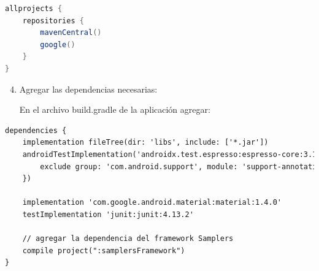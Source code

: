 \begin{lstlisting}[language=Java, frame=tlbr, caption=Configuración del repositorio de Google(línea 4)]
allprojects {
    repositories {
        mavenCentral()
        google()
    }
}
\end{lstlisting}		
							
			
\begin{enumerate}
  \setcounter{enumi}{3}
	\item Agregar las dependencias necesarias:
	
	En el archivo build.gradle de la aplicación agregar: 
	
\end{enumerate}	
	

\begin{lstlisting}[language=XML, frame=tlbr, caption=Configuración de la dependencia del framework (línea 11)]
dependencies {
	implementation fileTree(dir: 'libs', include: ['*.jar'])
	androidTestImplementation('androidx.test.espresso:espresso-core:3.1.0', {
		exclude group: 'com.android.support', module: 'support-annotations'
	})

	implementation 'com.google.android.material:material:1.4.0'
	testImplementation 'junit:junit:4.13.2'

	// agregar la dependencia del framework Samplers
	compile project(":samplersFramework")
}
\end{lstlisting}	
			
